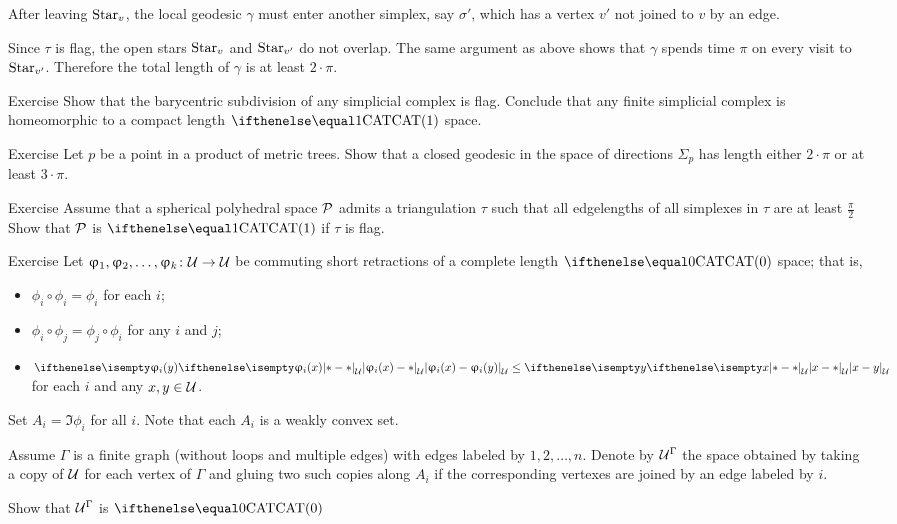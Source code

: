 After leaving $\mathop{\rm Star}\nolimits_v$,
the local geodesic $\gamma$ must enter another simplex, 
say $\sigma'$, 
which has a vertex $v'$ not joined to $v$ by an edge.

Since $\tau$ is flag, the open  stars $\mathop{\rm Star}\nolimits_v$ and $\mathop{\rm Star}\nolimits_{v'}$
do not overlap.
The same argument as above shows that $\gamma$ spends time $\pi$ on every visit to $\mathop{\rm Star}\nolimits_{v'}$.
Therefore the total length of $\gamma$ is at least $2\cdot\pi$.
\qeds

\begin{thm}{Exercise}\label{ex:barycenric-flag}
Show that the barycentric subdivision of any simplicial complex is flag.
Conclude that any finite  simplicial complex is homeomorphic to a compact length $\CAT1$ space.
\end{thm}

\begin{thm}{Exercise}\label{ex:tree-product}
Let $p$ be a point in a product of metric trees.
Show that a closed geodesic in the space of directions $\Sigma_p$ has length either $2\cdot\pi$ or at least $3\cdot\pi$.
\end{thm}


\begin{thm}{Exercise}\label{ex:obtuce-flag}
Assume that a spherical polyhedral space $\mathcal{P}$
admits a triangulation $\tau$ such that all edgelengths of all simplexes in $\tau$ are at least $\tfrac\pi2$
Show that $\mathcal{P}$ is $\CAT{1}$
if $\tau$ is flag.
\end{thm}

\begin{thm}{Exercise}\label{ex:short+commuting}
Let $\phi_1,\phi_2,\dots,\phi_k\:\spc{U}\to \spc{U}$ be commuting short retractions of
a complete length $\CAT0$ space; 
that is, 
\begin{itemize}
\item $\phi_i\circ\phi_i=\phi_i$ for each $i$;
\item $\phi_i\circ\phi_j=\phi_j\circ\phi_i$ for any $i$ and $j$;
\item $\dist{\phi_i(x)}{\phi_i(y)}{\spc{U}}\le \dist{x}{y}{\spc{U}}$ for each $i$ and any $x,y\in\spc{U}$.
\end{itemize}
Set $A_i=\Im \phi_i$ for all $i$.
Note that each $A_i$ is a weakly convex set.

Assume $\Gamma$ is a finite graph 
(without loops and multiple edges) 
with edges labeled by $1,2,\dots, n$.
Denote by $\mathcal{U}^\Gamma$ the space obtained by taking 
a copy of $\mathcal{U}$ for each vertex of $\Gamma$ and 
gluing two such copies along $A_i$ if the corresponding vertexes are joined by an edge labeled by $i$.

Show that $\mathcal{U}^\Gamma$ is $\CAT0$
\end{thm}

